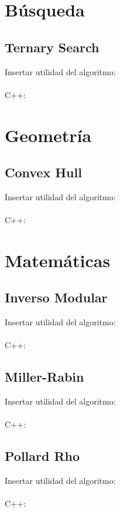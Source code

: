 \documentclass{article}
\begin{document}
\section*{Búsqueda}
    \subsection*{Ternary Search}
        Insertar utilidad del algoritmo:
        \\ \\
        C++:
        
\pagebreak
\section*{Geometría}
    \subsection*{Convex Hull}
        Insertar utilidad del algoritmo:
        \\ \\
        C++:
        
\pagebreak
\section*{Matemáticas}
    \subsection*{Inverso Modular}
        Insertar utilidad del algoritmo:
        \\ \\
        C++:
        
    \subsection*{Miller-Rabin}
        Insertar utilidad del algoritmo:
        \\ \\
        C++:
        
    \subsection*{Pollard Rho}
        Insertar utilidad del algoritmo:
        \\ \\
        C++:
        
\pagebreak
\end{document}
